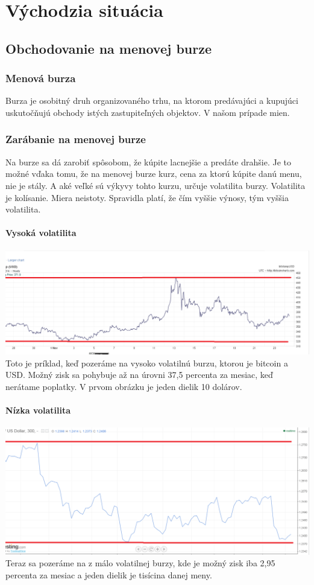 \chapter{Východzia situácia}\label{chap:intro} 
\section{Obchodovanie na menovej burze}
\subsection{Menová burza}  
Burza je osobitný druh organizovaného trhu, na ktorom predávajúci a kupujúci uskutočňujú obchody istých zastupiteľných objektov. V našom prípade mien.
\subsection{Zarábanie na menovej burze}
Na burze sa dá zarobiť spôsobom, že kúpite lacnejšie a predáte drahšie. Je to možné vďaka tomu, že na menovej burze kurz, cena za ktorú kúpite danú menu, nie je stály. A aké veľké sú výkyvy tohto kurzu, určuje volatilita burzy.
Volatilita\cite{Volatilita} je kolísanie. Miera neistoty. Spravidla platí, že čím vyššie výnosy, tým vyššia volatilita. 
\subsubsection{Vysoká volatilita} 
\includegraphics[width=1\textwidth]{obr} 
Toto je príklad, keď pozeráme na vysoko volatilnú burzu, ktorou je bitcoin a USD. Možný zisk sa pohybuje až na úrovni 37,5 percenta za mesiac, keď nerátame poplatky. V prvom obrázku je jeden dielik 10 dolárov.   
\subsubsection{Nízka volatilita}  
\includegraphics[width=1\textwidth]{obr2} 
Teraz sa pozeráme na   z málo volatilnej burzy, kde je  možný zisk iba 2,95 percenta za mesiac a jeden dielik je tisícina danej meny.   

